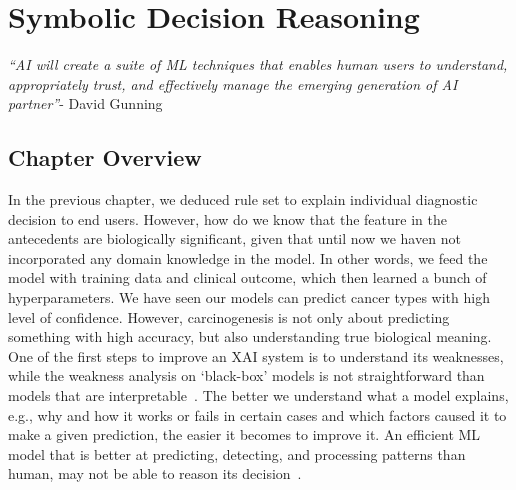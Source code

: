 \chapter{Symbolic Decision Reasoning}\label{chapter:nsr}
\textit{``AI will create a suite of ML techniques that enables human users to understand, appropriately trust, and effectively manage the emerging generation of AI partner''}- David Gunning

\section{Chapter Overview}
In the previous chapter, we deduced rule set to explain individual diagnostic decision to end users. However, how do we know that the feature in the antecedents are biologically significant, given that until now we haven not incorporated any domain knowledge in the model. In other words, we feed the model with training data and clinical outcome, which then learned a bunch of hyperparameters. We have seen our models can predict cancer types with high level of confidence. However, carcinogenesis is not only about predicting something with high accuracy, but also understanding true biological meaning. One of the first steps to improve an XAI system is to understand its weaknesses, while the weakness analysis on `black-box' models is not straightforward than models that are interpretable~\cite{bhatt2020explainable}. The better we understand what a model explains, e.g., why and how it works or fails in certain cases and which factors caused it to make a given prediction, the easier it becomes to improve it. An efficient ML model that is better at predicting, detecting, and processing patterns than human, may not be able to reason its decision~\cite{miller2018explanation}. 

